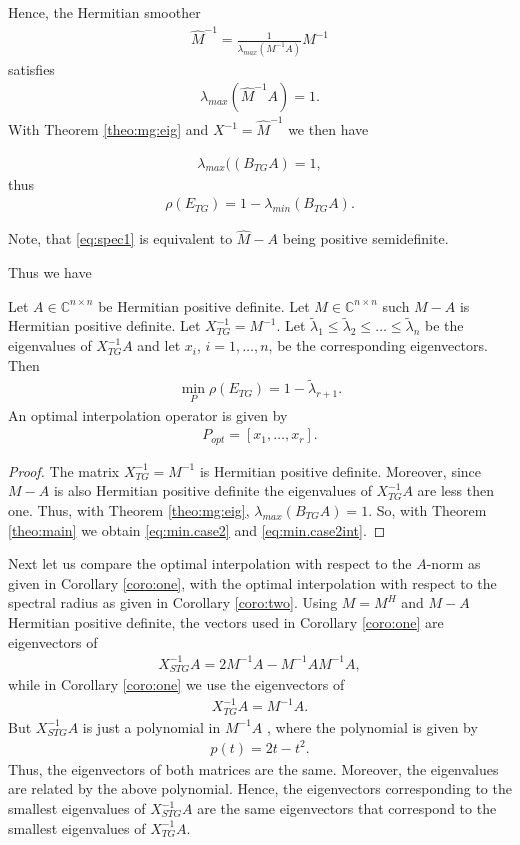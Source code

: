 \documentclass[final]{siamltex}
\newcommand{\beqo}{\begin{eqnarray*}}
\newcommand{\beq}{\begin{eqnarray}}
\newcommand{\eeqo}{\end{eqnarray*}}
\newcommand{\eeq}{\end{eqnarray}}
\numberwithin{equation}{section}
\newcommand{\inCnn}{\in \mathbb{C}^{n \times n}}
\begin{document}
Hence, the  Hermitian smoother
\beqo
\hat M^{-1} = \frac{1}{\lambda_{max}(M^{-1}A)}M^{-1}
\eeqo
satisfies
\beq \label{eq:spec1}
\lambda_{max}(\hat M^{-1}A) = 1.
\eeq
With Theorem \ref{theo:mg:eig} and $X^{-1} = \hat M^{-1}$ we then have 

\beqo
\lambda_{max} ((B_{TG}A) = 1,
\eeqo
thus
\beqo
\rho(E_{TG}) = 1 - \lambda_{min } (B_{TG}A).
\eeqo

Note, that \eqref{eq:spec1} is equivalent to  $\hat M - A $ being positive
semidefinite.

Thus we  have 






\begin{corollary} \label{coro:two}
Let  $A\inCnn$  be Hermitian positive definite. Let $ M \inCnn$ such $M - A$ is
Hermitian positive definite.
Let $X_{TG}^{-1} =  M^{-1}$.   
 Let $
\tilde \lambda_1 \leq \tilde \lambda_2 \leq \ldots \leq  \tilde \lambda_n $
be the  eigenvalues of $X_{TG}^{-1}A$  and let $x_i$, $i = 1, \ldots, n$, be
the corresponding eigenvectors. Then
\beq \label{eq:min.case2}
\min_{P}\rho(E_{TG}) = 1 - \tilde \lambda_{r+1}.
\eeq
An optimal interpolation operator is given by 
\beq  \label{eq:min.case2int}
P_{opt} = [x_{1}, \ldots , x_r].
\eeq
\end{corollary}
\begin{proof}
The matrix $X_{TG}^{-1} = M^{-1}$ is Hermitian positive definite. Moreover,
since $M - A$ is also Hermitian positive definite the eigenvalues of
$X_{TG}^{-1}A$ are less then  one. Thus, with Theorem \ref{theo:mg:eig},
$\lambda_{max}(B_{TG}A) = 1$.  So, with  Theorem \ref{theo:main}  we obtain
\eqref{eq:min.case2} and \eqref{eq:min.case2int}.
\end{proof}

Next let us compare the optimal interpolation with respect to the $A$-norm as
given in Corollary \ref{coro:one}, with  the optimal interpolation with respect
to the spectral radius as given in Corollary \ref{coro:two}. Using $M=M^H$ and
$M - A$ Hermitian positive definite, the vectors used in  Corollary
\ref{coro:one}
are  eigenvectors of
\beqo
X^{-1}_{STG}A = 2M^{-1}A - M^{-1}AM^{-1}A,
\eeqo
while in Corollary \ref{coro:one} we use  the eigenvectors of
\beqo
X^{-1}_{TG}A = M^{-1}A.
\eeqo
But $X^{-1}_{STG}A$ is just a polynomial in $M^{-1}A$ , where   the polynomial
is given by
\beq \label{eq:pol}
p(t) = 2t - t^2.
\eeq
Thus, the eigenvectors of both matrices are the same. Moreover, the
eigenvalues are  related
by   the above polynomial. Hence, the eigenvectors corresponding  to the
smallest eigenvalues of
$X^{-1}_{STG}A$  are the same   eigenvectors that correspond to the smallest
eigenvalues of $X^{-1}_{TG}A$.
\end{document}
